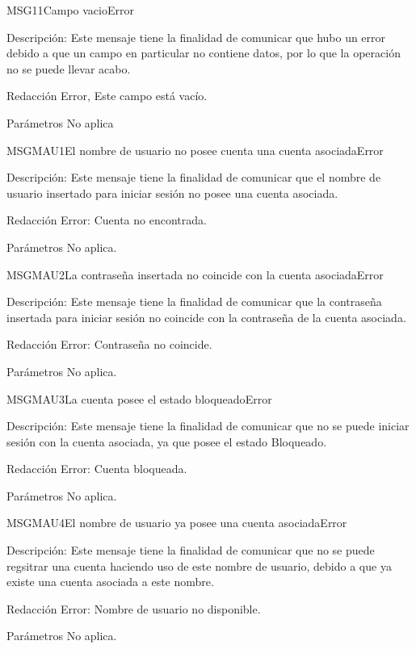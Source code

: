 \begin{mensaje}{MSG11}{Campo vacio}{Error}
	\item[Descripción:]Este mensaje tiene la finalidad de comunicar que hubo un error debido a que un campo en particular no contiene datos, por lo que la operación no se puede llevar acabo.
	\item[Redacción] Error, Este campo está vacío.
	\item[Parámetros] No aplica
\end{mensaje}


\begin{mensaje}{MSGMAU1}{El nombre de usuario no posee cuenta una cuenta asociada}{Error}
	\item[Descripción:] Este mensaje tiene la finalidad de comunicar que el nombre de usuario insertado para iniciar sesión no posee una cuenta asociada.
	\item[Redacción] Error: Cuenta no encontrada.
	\item[Parámetros] No aplica.
\end{mensaje}

\begin{mensaje}{MSGMAU2}{La contraseña insertada no coincide con la cuenta asociada}{Error}
	\item[Descripción:] Este mensaje tiene la finalidad de comunicar que la contraseña insertada para iniciar sesión no coincide con la contraseña de la cuenta asociada.
	\item[Redacción] Error: Contraseña no coincide.
	\item[Parámetros] No aplica.
\end{mensaje}

\begin{mensaje}{MSGMAU3}{La cuenta posee el estado bloqueado}{Error}
	\item[Descripción:] Este mensaje tiene la finalidad de comunicar que no se puede iniciar sesión con la cuenta asociada, ya que posee el estado Bloqueado.
	\item[Redacción] Error: Cuenta bloqueada.
	\item[Parámetros] No aplica.
\end{mensaje}

\begin{mensaje}{MSGMAU4}{El nombre de usuario ya posee una cuenta asociada}{Error}
	\item[Descripción:] Este mensaje tiene la finalidad de comunicar que no se puede regsitrar una cuenta haciendo uso de este nombre de usuario, debido a que ya existe una cuenta asociada a este nombre. 
	\item[Redacción] Error: Nombre de usuario no disponible.
	\item[Parámetros] No aplica.
\end{mensaje}

